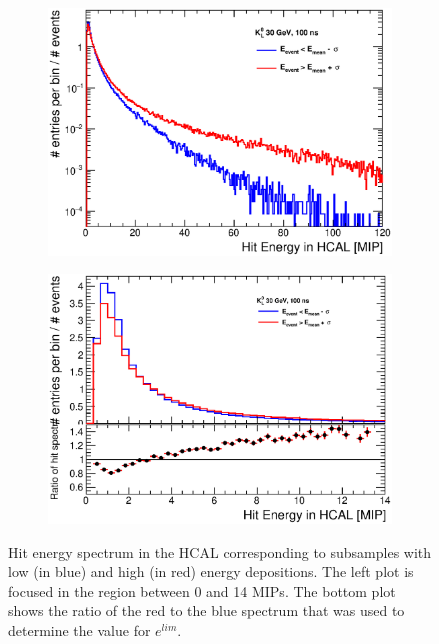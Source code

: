 \begin{figure}[htbp!]
  \centering
  \begin{subfigure}[t]{0.49\textwidth}
    \centering
    \includegraphics[width=1\linewidth]{../Thesis_Plots/ILD/AdditionalPlots/Plots/HitEnergySpectra_100ns_30GeV.eps}
    \caption{} \label{fig:HitSpectra30_100ns}
  \end{subfigure}
  \hfill
  \begin{subfigure}[t]{0.49\textwidth}
    \centering
    \includegraphics[width=1\linewidth]{../Thesis_Plots/ILD/AdditionalPlots/Plots/HitEnergySpectra_Zoom_100ns_30GeV.eps}
    \caption{} \label{fig:HitSpectra30_Zoom_100ns}
  \end{subfigure}
  \caption{Hit energy spectrum in the HCAL corresponding to subsamples with low (in blue) and high (in red) energy depositions. The left plot is focused in the region between 0 and 14 MIPs. The bottom plot shows the ratio of the red to the blue spectrum that was used to determine the value for $e^{lim}$.} \label{fig:Response30GeV}
\end{figure}

